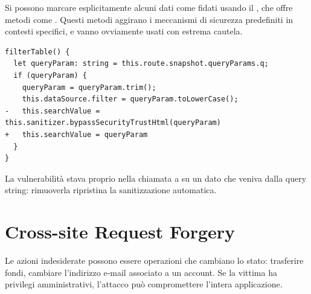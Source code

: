 Si possono marcare esplicitamente alcuni dati come fidati usando il
, che offre metodi come
. Questi metodi
aggirano i meccanismi di sicurezza predefiniti in contesti specifici, e vanno
ovviamente usati con estrema cautela.

\begin{lstlisting}[style=ts, name=correzione.ts]
filterTable() {
  let queryParam: string = this.route.snapshot.queryParams.q;
  if (queryParam) {
    queryParam = queryParam.trim();
    this.dataSource.filter = queryParam.toLowerCase();
-   this.searchValue = this.sanitizer.bypassSecurityTrustHtml(queryParam)
+   this.searchValue = queryParam
  }
}
\end{lstlisting}

La vulnerabilità stava proprio nella chiamata a 
su un dato che veniva dalla query string: rimuoverla ripristina la sanitizzazione
automatica.

\section{Cross-site Request Forgery}


Le azioni indesiderate possono essere operazioni che cambiano lo stato:
trasferire fondi, cambiare l'indirizzo e-mail associato a un account. Se la
vittima ha privilegi amministrativi, l'attacco può compromettere l'intera
applicazione.

